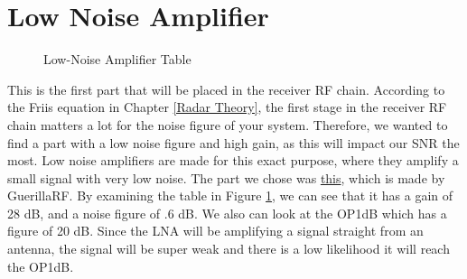 \section{Low Noise Amplifier}
\begin{figure}[H]
  \centering
  \caption{Low-Noise Amplifier Table}
  \label{img:lnatable}
\end{figure}

This is the first part that will be placed in the receiver RF chain. According to the Friis equation in Chapter \ref{Radar Theory},
the first stage in the receiver RF chain matters a lot for the noise figure of your system. Therefore, we wanted to find a part
with a low noise figure and high gain, as this will impact our SNR the most. Low noise amplifiers are made for this exact purpose,
where they amplify a small signal with very low noise. The part we chose was \href{https://www.mouser.com/ProductDetail/Guerrilla-RF/GRF2133W?qs=ulEaXIWI0c%2FXgAPwqRmr2A%3D%3D}{this},
which is made by GuerillaRF. By examining the table in Figure \ref{img:lnatable}, we can see that it has a gain of 28 dB,
and a noise figure of .6 dB. We also can look at the OP1dB which has a figure of 20 dB. Since the LNA will be amplifying a signal
straight from an antenna, the signal will be super weak and there is a low likelihood it will reach the OP1dB.

